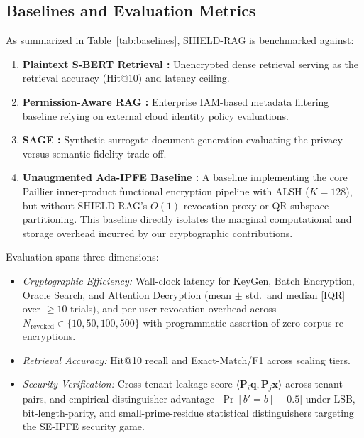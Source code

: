 \documentclass[10pt,a4paper]{article}
\begin{document}
\subsection{Baselines and Evaluation Metrics}
As summarized in Table~\ref{tab:baselines}, SHIELD-RAG is benchmarked against:
\begin{enumerate}
    \item \textbf{Plaintext S-BERT Retrieval \cite{lewis2020rag}:} Unencrypted dense retrieval serving as the retrieval accuracy (Hit@10) and latency ceiling.
    \item \textbf{Permission-Aware RAG \cite{jeong2025permissionaware}:} Enterprise IAM-based metadata filtering baseline relying on external cloud identity policy evaluations.
    \item \textbf{SAGE \cite{zeng2025mitigating}:} Synthetic-surrogate document generation evaluating the privacy versus semantic fidelity trade-off.
    \item \textbf{Unaugmented Ada-IPFE Baseline \cite{zhou2026cipherag, yang2022privacypreserving}:} A baseline implementing the core Paillier inner-product functional encryption pipeline with ALSH ($K=128$), but without SHIELD-RAG's $O(1)$ revocation proxy or QR subspace partitioning. This baseline directly isolates the marginal computational and storage overhead incurred by our cryptographic contributions.
\end{enumerate}

Evaluation spans three dimensions:
\begin{itemize}
    \item \textit{Cryptographic Efficiency:} Wall-clock latency for KeyGen, Batch Encryption, Oracle Search, and Attention Decryption (mean $\pm$ std.\ and median [IQR] over $\ge10$ trials), and per-user revocation overhead across $N_{\text{revoked}} \in \{10,50,100,500\}$ with programmatic assertion of zero corpus re-encryptions.
    \item \textit{Retrieval Accuracy:} Hit@10 recall and Exact-Match/F1 \cite{khan2025evidencebot, jeong2025permissionaware} across scaling tiers.
    \item \textit{Security Verification:} Cross-tenant leakage score $\langle \mathbf{P}_i\mathbf{q}, \mathbf{P}_j\mathbf{x}\rangle$ across tenant pairs, and empirical distinguisher advantage $|\Pr[b'{=}b]-0.5|$ under LSB, bit-length-parity, and small-prime-residue statistical distinguishers targeting the SE-IPFE security game.
\end{itemize}
\end{document}
